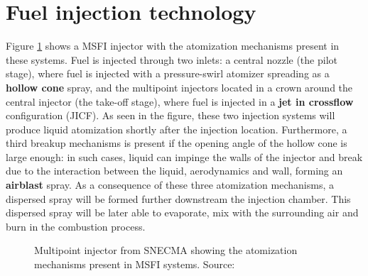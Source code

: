 \section{Fuel injection technology}
\label{sec:ch1_fuel_injection_technology}

Figure \ref{fig:multipoint_injector_snecma} shows a MSFI injector with the atomization mechanisms present in these systems. Fuel is injected through two inlets: a central nozzle (the pilot stage), where fuel is injected with a pressure-swirl atomizer spreading as a \textbf{hollow cone} spray, and the multipoint injectors located in a crown around the central injector (the take-off stage), where fuel is injected in a \textbf{jet in crossflow} configuration (JICF). As seen in the figure, these two injection systems will produce liquid atomization shortly after the injection location. Furthermore, a third breakup mechanisms is present if the opening angle of the hollow cone is large enough: in such cases, liquid can impinge the walls of the injector and break due to the interaction between the liquid, aerodynamics and wall, forming an \textbf{airblast} spray. As a consequence of these three atomization mechanisms, a dispersed spray will be formed further downstream the injection chamber. This dispersed spray will be later able to evaporate, mix with the surrounding air and burn in the combustion process.




\begin{figure}[ht]
     \centering
      \caption[Multipoint injector from SNECMA showing the atomization mechanisms present in MSFI systems]{Multipoint injector from SNECMA showing the atomization mechanisms present in MSFI systems. Source: }
      \label{fig:multipoint_injector_snecma}
\end{figure}

